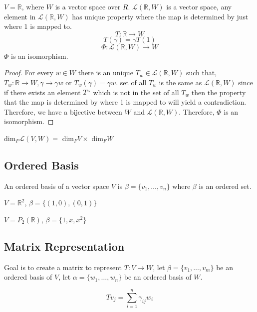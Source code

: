 \documentclass[11pt,a4paper]{colorart}
\def\l{\left}
\def\r{\right}
\def\R{\mathbb{R}}
\def\a{\alpha}
\def\b{\beta}
\def\g{\gamma}
\def\L{\mathcal{L}}
\begin{document}
\begin{example}
	$V = \R$, where $W$ is a vector space over $R$. $\L\l(\R,W\r)$ is a vector space, any element in $\L\l(\R,W\r)$ has unique property where the map is determined by just where $1$ is mapped to. 
	\[T:\R\rightarrow W\]
	\[T\l(\g\r) = \g T\l(1\r) \]
	\[ \Phi: \L\l(\R,W\r) \rightarrow W \]
	$\Phi$ is an isomorphism.
	\begin{proof}
		For every $w\in W$ there is an unique $T_w\in\L\l(\R,W\r)$ such that, $T_w:\R\rightarrow W, \g\rightarrow\g w$ or $T_w\l(\g\r)=\g w$. set of all $T_w$ is the same as $\L\l(\R,W\r)$ since if there exists an element $T`$ which is not in the set of all $T_w$ then the property that the map is determined by where 1 is mapped to will yield a contradiction. Therefore, we have a bijective between $W$ and $\L\l(\R,W\r)$. Therefore, $\Phi$ is an isomorphism.
	\end{proof}
\end{example}

\begin{conjecture}
	dim$_F\L\l(V,W\r) =$ dim$_FV\times$ dim$_FW$
\end{conjecture}

\subsection{Ordered Basis}

\begin{definition}
	An ordered basis of a vector space $V$ is $\b = \{v_1,\dots,v_n\}$ where $\b$ is an ordered set.
\end{definition}

\begin{example}
	$V=\R^2$, $\b =\{ \l(1,0\r),\l(0,1\r)\}$
\end{example}

\begin{example}
	$V=P_2\l(\R\r)$, $\b =\{1,x,x^2\}$
\end{example}

\subsection{Matrix Representation}

Goal is to create a matrix to represent $T:V\rightarrow W$, let $\b=\{v_1,\dots,v_m\}$ be an ordered basis of $V$, let $\a=\{w_1,\dots,w_n\}$ be an ordered basis of $W$.

\[ Tv_j = \sum_{i=1}^n \g_{ij}w_i \]
\end{document}
